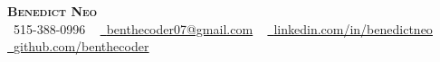 \begin{center}
    \textbf{\Huge \scshape Benedict Neo} \\ \vspace{10pt}
    \small \raisebox{-0.2\height}\faPhone\ 515-388-0996  ~ 
    \href{mailto:benthecoder07@gmail.com}{\raisebox{-0.2\height}\faEnvelope\  \underline{benthecoder07@gmail.com}} ~ 
    \href{https://www.linkedin.com/in/benedictneo/}{\raisebox{-0.2\height}\faLinkedin\ \underline{linkedin.com/in/benedictneo}}  ~
    \href{https://github.com/benthecoder/}{\raisebox{-0.2\height}\faGithub\ \underline{github.com/benthecoder}}
    \vspace{7pt}
\end{center}